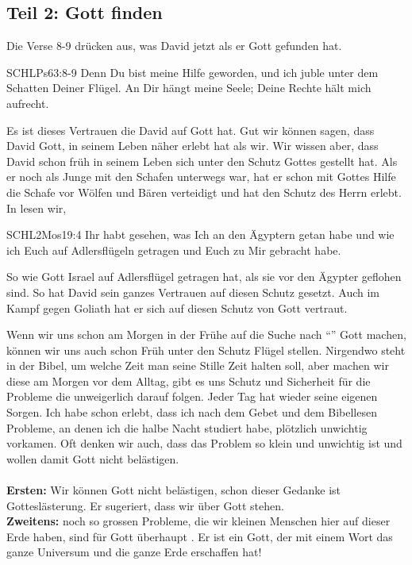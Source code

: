 \documentclass[14pt]{../../inc/mybib}
\begin{document}
    \subsection*{Teil 2: Gott finden}
    \begin{block}
        Die Verse 8-9 drücken aus, was David jetzt als er Gott gefunden hat.
        \begin{bibelbox}{SCHL}{Ps}{63:8-9}
            Denn Du bist meine Hilfe geworden, und ich juble unter dem Schatten Deiner Flügel. An Dir hängt meine Seele; Deine Rechte hält mich aufrecht.
        \end{bibelbox}
        Es ist dieses Vertrauen die David auf Gott hat. Gut wir können sagen, dass David Gott, in seinem Leben näher erlebt hat als wir. Wir wissen aber, dass David schon früh in seinem Leben sich unter den Schutz Gottes gestellt hat. Als er noch als Junge mit den Schafen unterwegs war, hat er schon mit Gottes Hilfe die Schafe vor Wölfen und Bären verteidigt und hat den Schutz des Herrn erlebt.
        In lesen wir,
        \begin{bibelbox}{SCHL}{2Mos}{19:4}
            Ihr habt gesehen, was Ich an den Ägyptern getan habe und wie ich Euch auf Adlersflügeln getragen und Euch zu Mir gebracht habe.
        \end{bibelbox}
        
         So wie Gott Israel auf Adlersflügel getragen hat, als sie vor den Ägypter geflohen sind. So hat David sein ganzes Vertrauen auf diesen Schutz gesetzt. Auch im Kampf gegen Goliath hat er sich auf diesen Schutz von Gott vertraut. 
    \end{block}
    \begin{block}
        Wenn wir uns schon am Morgen in der Frühe auf die Suche nach \enquote{} Gott machen, können wir uns auch schon Früh unter den Schutz  Flügel stellen. Nirgendwo steht in der Bibel, um welche Zeit man seine Stille Zeit halten soll, aber machen wir diese am Morgen vor dem Alltag, gibt es uns Schutz und Sicherheit für die Probleme die unweigerlich darauf folgen. Jeder Tag hat wieder seine eigenen Sorgen. 
        Ich habe schon erlebt, dass ich nach dem Gebet und dem Bibellesen Probleme, an denen ich die halbe Nacht studiert habe, plötzlich unwichtig vorkamen. Oft denken wir auch, dass das Problem so klein und unwichtig ist und wollen damit Gott nicht belästigen.\\        
         \\        
        \textbf{Ersten:} Wir können Gott nicht belästigen, schon dieser Gedanke ist Gotteslästerung. Er sugeriert, dass wir über Gott stehen. \\        
        \textbf{Zweitens:}  noch so grossen Probleme, die wir kleinen Menschen hier auf dieser Erde haben, sind für Gott überhaupt . Er ist ein Gott, der mit einem Wort das ganze Universum und die ganze Erde erschaffen hat!
    \end{block}
\end{document}
